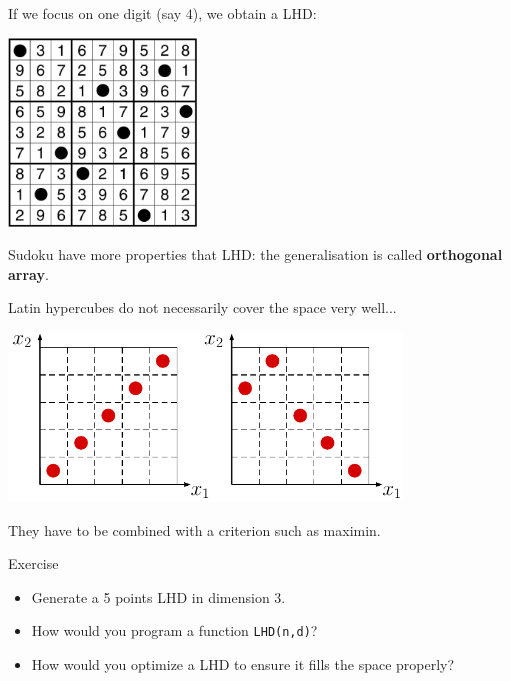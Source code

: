 \documentclass{beamer}
\begin{document}
\begin{frame}{}
If we focus on one digit (say $4$), we obtain a LHD:
\vspace{2mm}
\begin{center}
\includegraphics[height=5cm]{figures/latexdraw/sudoku}
\end{center}
Sudoku have more properties that LHD: the generalisation is called \textbf{orthogonal array}.
\end{frame}

\begin{frame}{}
Latin hypercubes do not necessarily cover the space very well...
\begin{center}
\includegraphics[height=4.5cm]{figures/latexdraw/lhs2}
\end{center}
They have to be combined with a criterion such as maximin.
\end{frame}

\begin{frame}{}
\begin{exampleblock}{Exercise}
\begin{itemize}
	\item Generate a 5 points LHD in dimension 3.
	\item How would you program a function \texttt{LHD(n,d)}?
	\item How would you optimize a LHD to ensure it fills the space properly?
\end{itemize}
\end{exampleblock}
\end{frame}
\end{document}
